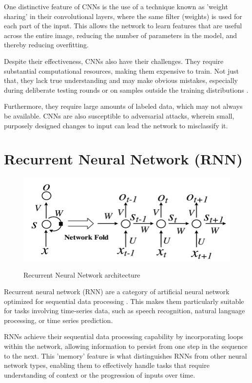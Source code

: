 One distinctive feature of CNNs is the use of a technique known as 'weight sharing' in their convolutional layers, where the same filter (weights) is used for each part of the input. This allows the network to learn features that are useful across the entire image, reducing the number of parameters in the model, and thereby reducing overfitting.

Despite their effectiveness, CNNs also have their challenges. They require substantial computational resources, making them expensive to train. Not just that, they lack true understanding and may make obvious mistakes, especially during deliberate testing rounds or on samples outside the training distributions \parencite{Yan2017HowIA}. 

Furthermore, they require large amounts of labeled data, which may not always be available. CNNs are also susceptible to adversarial attacks, wherein small, purposely designed changes to input can lead the network to misclassify it.\\

\newpage
\section{Recurrent Neural Network (RNN)}
\begin{figure}[h]
    \centering
    \includegraphics[scale=0.4]{images/literature review/RNN.png}
    \caption{Recurrent Neural Network architecture}
    \label{fig:ANN}
    \parencite{Gao2018}
\end{figure}
Recurrent neural network (RNN) are a category of artificial neural network optimized for sequential data processing \parencite{Jain1999}. This makes them particularly suitable for tasks involving time-series data, such as speech recognition, natural language processing, or time series prediction.

RNNs achieve their sequential data processing capability by incorporating loops within the network, allowing information to persist from one step in the sequence to the next. This 'memory' feature is what distinguishes RNNs from other neural network types, enabling them to effectively handle tasks that require understanding of context or the progression of inputs over time.

